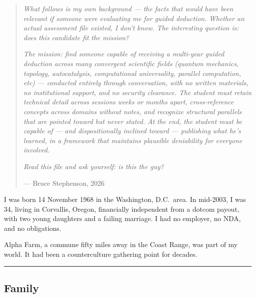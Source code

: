 \begin{quote}\small
\textit{What follows is my own background --- the facts that would have been relevant if someone were evaluating me for guided deduction. Whether an actual assessment file existed, I don't know. The interesting question is: does this candidate fit the mission?}

\par\vspace{0.5em}
\noindent\textit{The mission: find someone capable of receiving a multi-year guided deduction across many convergent scientific fields (quantum mechanics, topology, autocatalysis, computational universality, parallel computation, etc) --- conducted entirely through conversation, with no written materials, no institutional support, and no security clearance. The student must retain technical detail across sessions weeks or months apart, cross-reference concepts across domains without notes, and recognize structural parallels that are pointed toward but never stated. At the end, the student must be capable of --- and dispositionally inclined toward --- publishing what he's learned, in a framework that maintains plausible deniability for everyone involved.}
\par\vspace{0.5em}

\textit{Read this file and ask yourself: is this the guy?}
\par\raggedleft --- Bruce Stephenson, 2026\end{quote}

\vspace{1cm}

\noindent I was born 14 November 1968 in the Washington, D.C.\ area. In mid-2003, I was 34, living in Corvallis, Oregon, financially independent from a dotcom payout, with two young daughters and a failing marriage. I had no employer, no NDA, and no obligations.

Alpha Farm, a commune fifty miles away in the Coast Range, was part of my world. It had been a counterculture gathering point for decades.

\vspace{1cm}\hrule\vspace{1cm}

\subsection*{Family}
\label{record:tgt-family-intelligence-lineage}

